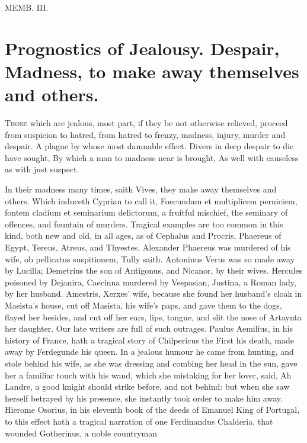 {MEMB. III.

\section[Prognostics of Jealousy.]{Prognostics of Jealousy. Despair, Madness, to make away themselves and others.}

\lettrine{T}{hose} which are jealous, most part, if they be not otherwise relieved,
proceed from suspicion to hatred, from hatred to frenzy, madness,
injury, murder and despair.
A plague by whose most damnable effect.
Divers in deep despair to die have sought,
By which a man to madness near is brought,
As well with causeless as with just suspect.

In their madness many times, saith Vives, they make away
themselves and others. Which induceth Cyprian to call it, Foecundam et
multiplicem perniciem, fontem cladium et seminarium delictorum, a
fruitful mischief, the seminary of offences, and fountain of murders.
Tragical examples are too common in this kind, both new and old, in all
ages, as of  Cephalus and Procris, Phaereus of Egypt,
Tereus, Atreus, and Thyestes. Alexander Phaereus was murdered of
his wife, ob pellicatus suspitionem, Tully saith. Antoninus Verus was
so made away by Lucilla; Demetrius the son of Antigonus, and Nicanor,
by their wives. Hercules poisoned by Dejanira, Caecinna murdered
by Vespasian, Justina, a Roman lady, by her husband. Amestris,
Xerxes' wife, because she found her husband's cloak in Masista's house,
cut off Masista, his wife's paps, and gave them to the dogs, flayed her
besides, and cut off her ears, lips, tongue, and slit the nose of
Artaynta her daughter. Our late writers are full of such outrages.
Paulus Aemilius, in his history of France, hath a tragical story
of Chilpericus the First his death, made away by Ferdegunde his queen.
In a jealous humour he came from hunting, and stole behind his wife, as
she was dressing and combing her head in the sun, gave her a familiar
touch with his wand, which she mistaking for her lover, said, Ah
Landre, a good knight should strike before, and not behind: but when
she saw herself betrayed by his presence, she instantly took order to
make him away. Hierome Osorius, in his eleventh book of the deeds of
Emanuel King of Portugal, to this effect hath a tragical narration of
one Ferdinandus Chalderia, that wounded Gotherinus, a noble countryman
}
